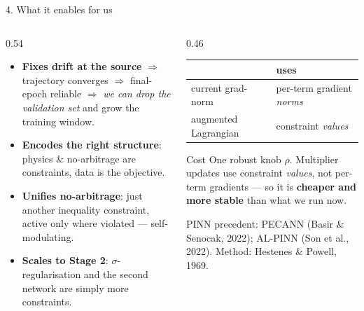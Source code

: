 \documentclass[aspectratio=169,11pt]{beamer}
\begin{document}
\begin{frame}{4. What it enables for us}
  \begin{columns}[T]
    \begin{column}{0.54\textwidth}
      \begin{itemize}
        \item \textbf{Fixes drift at the source} $\Rightarrow$ trajectory
              converges $\Rightarrow$ final-epoch reliable $\Rightarrow$
              \emph{we can drop the validation set} and grow the training window.
        \item \textbf{Encodes the right structure}: physics \& no-arbitrage are
              constraints, data is the objective.
        \item \textbf{Unifies no-arbitrage}: just another inequality constraint,
              active only where violated --- self-modulating.
        \item \textbf{Scales to Stage 2}: $\sigma$-regularisation and the second
              network are simply more constraints.
      \end{itemize}
    \end{column}
    \begin{column}{0.46\textwidth}
      \footnotesize
      \begin{tabular}{@{}ll@{}}
        \toprule
        & uses \\
        \midrule
        current grad-norm & per-term gradient \emph{norms} \\
        augmented Lagrangian & constraint \emph{values} \\
        \bottomrule
      \end{tabular}
      \vspace{0.4em}
      \begin{block}{\footnotesize Cost}
        \footnotesize One robust knob $\rho$. Multiplier updates use constraint
        \emph{values}, not per-term gradients --- so it is \textbf{cheaper and more
        stable} than what we run now.
      \end{block}
      \scriptsize PINN precedent: PECANN (Basir \& Senocak, 2022); AL-PINN
      (Son et al., 2022). Method: Hestenes \& Powell, 1969.
    \end{column}
  \end{columns}
\end{frame}
\end{document}
